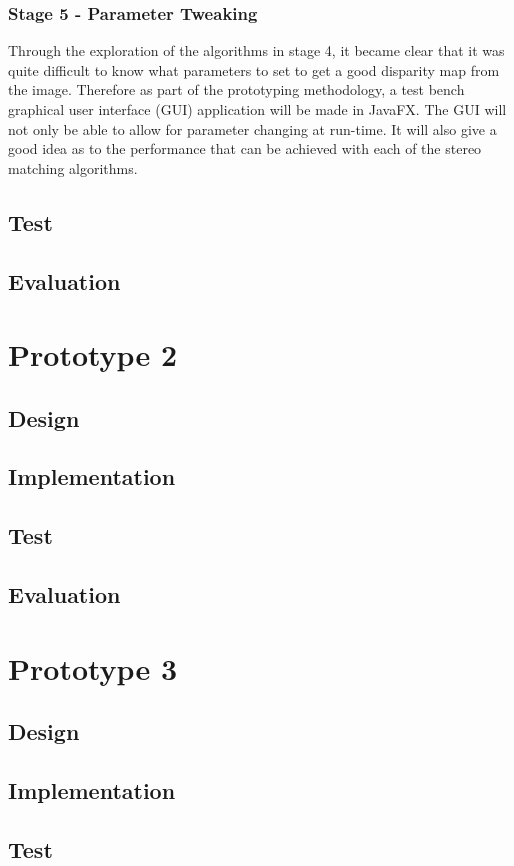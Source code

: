 \documentclass[11pt,oneside]{report}
\begin{document}
		\subsubsection{Stage 5 - Parameter Tweaking}
		Through the exploration of the algorithms in stage 4, it became clear that it was quite difficult to know what parameters to set to get a good disparity map from the image.
		Therefore as part of the prototyping methodology, a test bench graphical user interface (GUI) application will be made in JavaFX.
		The GUI will not only be able to allow for parameter changing at run-time.
		It will also give a good idea as to the performance that can be achieved with each of the stereo matching algorithms.
		\subsection{Test}
		\subsection{Evaluation}
	\section{Prototype 2}\label{sec:p2}
		\subsection{Design}
		\subsection{Implementation}
		\subsection{Test}
		\subsection{Evaluation}
	\section{Prototype 3}\label{sec:p3}
		\subsection{Design}
		\subsection{Implementation}
		\subsection{Test}
\end{document}
